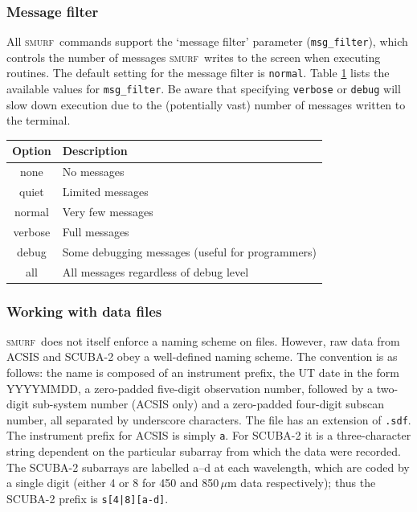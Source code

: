 \documentclass[twoside,11pt]{article}
\newcommand{\xlabel}[1]{}
\renewcommand{\_}{\texttt{\symbol{95}}}
\newcommand{\SMURF}{\textsc{smurf}}
\begin{document}
\subsubsection{Message filter}

All \SMURF\ commands support the `message filter' parameter
(\verb+msg_filter+), which controls the number of messages \SMURF\
writes to the screen when executing routines. The default setting for
the message filter is \verb+normal+. Table \ref{tab:msgfilter} lists
the available values for \verb+msg_filter+. Be aware that specifying
\verb+verbose+ or \verb+debug+ will slow down execution due to the
(potentially vast) number of messages written to the terminal.

\begin{table}
\centering
\begin{tabular}{|c|l|}
\hline
Option  & Description \\
\hline
none    & No messages \\
quiet   & Limited messages \\
normal  & Very few messages \\
verbose & Full messages \\
debug   & Some debugging messages (useful for programmers) \\
all     & All messages regardless of debug level \\
\hline
\end{tabular}
\label{tab:msgfilter}
\end{table}

\subsubsection{\xlabel{files}Working with data files\label{se:files}}

\SMURF\ does not itself enforce a naming scheme on files. However, raw
data from ACSIS and SCUBA-2 obey a well-defined naming scheme. The
convention is as follows: the name is composed of an instrument
prefix, the UT date in the form YYYYMMDD, a zero-padded five-digit
observation number, followed by a two-digit sub-system number (ACSIS
only) and a zero-padded four-digit subscan number, all separated by
underscore characters. The file has an extension of \verb+.sdf+. The
instrument prefix for ACSIS is simply \verb+a+. For SCUBA-2 it is a
three-character string dependent on the particular subarray from which
the data were recorded. The SCUBA-2 subarrays are labelled a--d at
each wavelength, which are coded by a single digit (either 4 or 8 for
450 and 850\,$\mu$m data respectively); thus the SCUBA-2 prefix is
\verb+s[4|8][a-d]+.
\end{document}
